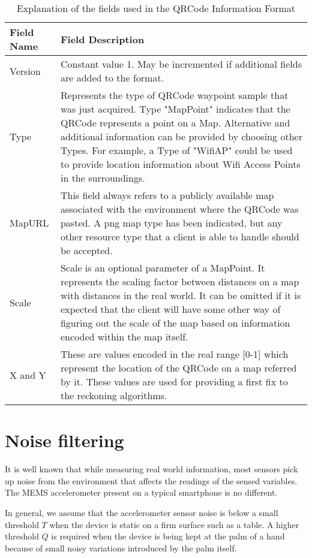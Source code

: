 \begin{table}
\centering
\begin{tabular}{p{1in} p{4in}}
\hline
\hline
Field Name      &       Field Description \\
\hline
Version         & Constant value 1. May be incremented if additional fields are added to the format. \\
Type            & Represents the type of QRCode waypoint sample that was just acquired. Type "MapPoint" indicates that the QRCode represents a point on a Map. Alternative and  additional information can be provided by choosing other Types. For example,  a Type of "WifiAP" could be used to provide location information about  Wifi Access Points in the surroundings. \\
MapURL          & This field always refers to a publicly available map associated with the environment where  the QRCode was pasted. A png map type has been indicated, but any other resource type that  a client is able to handle should be accepted. \\
Scale           & Scale is an optional parameter of a MapPoint. It represents the scaling factor between distances on a map with distances in the real world. It can be omitted if it is expected that the  client will have some other way of figuring out the scale of the map based on information encoded within the map itself. \\
X and Y         & These are values encoded in the real range [0-1] which represent the location of the QRCode on a map referred by it. These values are used for providing a first fix to the  reckoning algorithms.  \\
\hline
\end{tabular}
\caption{Explanation of the fields used in the QRCode Information Format\label{tbl:QRCode_fields_table}}
\end{table}

\section{Noise filtering\label{sec:NoiseClamping}}

It is well known that while measuring real world information, most sensors
 pick up noise from the environment that affects the readings of the 
sensed variables. The MEMS accelerometer present on a typical smartphone is 
no different. 

In general, we assume that the accelerometer sensor noise is below a small 
threshold $T$ when the device is static on a firm surface such as a table. 
A higher threshold $Q$ is required when the device is being kept at the palm of 
a hand because of small noisy variations introduced by the palm itself.

